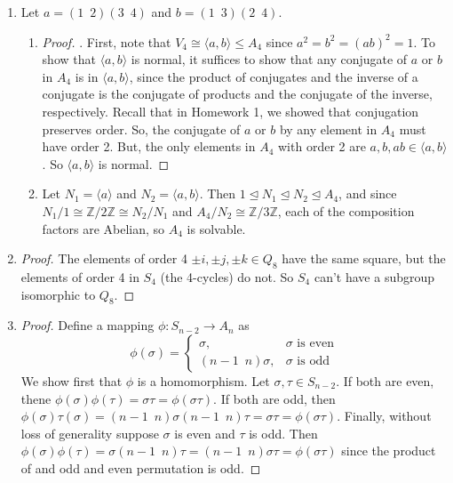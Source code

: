 \documentclass[11pt, letterpaper]{article}
\begin{document}
\begin{enumerate}
  \item Let $a = (1 \enspace 2)(3 \enspace 4)$ and $b = (1 \enspace 3)(2 \enspace 4)$.
  \begin{enumerate}
    \item \begin{proof}
      . First, note that $V_4 \cong \langle a, b \rangle \leq A_4$ since $a^2 = b^2 = (ab)^2 = 1$. To show that $\langle a, b \rangle$ is normal, it suffices to show that any conjugate of $a$ or $b$ in $A_4$ is in $\langle a, b \rangle$, since the product of conjugates and the inverse of a conjugate is the conjugate of products and the conjugate of the inverse, respectively. Recall that in Homework 1, we showed that conjugation preserves order. So, the conjugate of $a$ or $b$ by any element in $A_4$ must have order 2. But, the only elements in $A_4$ with order 2 are $a, b, ab \in \langle a, b \rangle$. So $\langle a, b \rangle$ is normal.
    \end{proof}

    \item Let $N_1 = \langle a \rangle$ and $N_2 = \langle a, b \rangle$. Then $1 \trianglelefteq N_1 \trianglelefteq N_2 \trianglelefteq A_4$, and since $N_1/1 \cong \mathbb Z/2\mathbb Z \cong N_2/N_1$ and $A_4/N_2 \cong \mathbb Z/3\mathbb Z$, each of the composition factors are Abelian, so $A_4$ is solvable. 

  \end{enumerate}
  
  \item \begin{proof}
    The elements of order 4 $\pm i, \pm j, \pm k \in Q_8$ have the same square, but the elements of order 4 in $S_4$ (the 4-cycles) do not. So $S_4$ can't have a subgroup isomorphic to $Q_8$.
  \end{proof}

  \item \begin{proof}
    Define a mapping $\phi: S_{n - 2} \to A_n$ as
    $$
    \phi(\sigma) = \begin{cases}
      \sigma, & \sigma \text{ is even} \\
      (n - 1 \enspace n) \sigma, & \sigma \text { is odd} 
    \end{cases}
    $$
    We show first that $\phi$ is a homomorphism. Let $\sigma, \tau \in S_{n - 2}$. If both are even, thene $\phi(\sigma)\phi(\tau) = \sigma\tau = \phi(\sigma\tau)$. If both are odd, then $\phi(\sigma)\tau(\sigma) = (n - 1 \enspace n)\sigma(n - 1 \enspace n)\tau = \sigma \tau = \phi(\sigma\tau)$. Finally, without loss of generality suppose $\sigma$ is even and $\tau$ is odd. Then $\phi(\sigma)\phi(\tau) = \sigma(n - 1 \enspace n)\tau = (n - 1 \enspace n) \sigma\tau = \phi(\sigma\tau)$ since the product of and odd and even permutation is odd.


\end{proof}
\end{enumerate}
\end{document}
